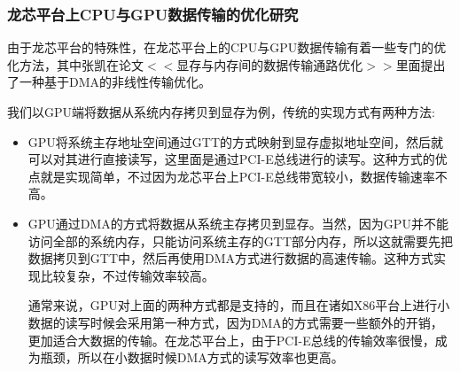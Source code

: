 \subsubsection{龙芯平台上CPU与GPU数据传输的优化研究}

由于龙芯平台的特殊性，在龙芯平台上的CPU与GPU数据传输有着一些专门的优化方法，其中张凯在论文$<<$显存与内存间的数据传输通路优化$>>$\cite{gpu-cpu-data}里面提出了一种基于DMA的非线性传输优化。

我们以GPU端将数据从系统内存拷贝到显存为例，传统的实现方式有两种方法:

\begin{itemize}
\item{} GPU将系统主存地址空间通过GTT的方式映射到显存虚拟地址空间，然后就可以对其进行直接读写，这里面是通过PCI-E总线进行的读写。这种方式的优点就是实现简单，不过因为龙芯平台上PCI-E总线带宽较小，数据传输速率不高。
\item{} GPU通过DMA的方式将数据从系统主存拷贝到显存。当然，因为GPU并不能访问全部的系统内存，只能访问系统主存的GTT部分内存，所以这就需要先把数据拷贝到GTT中，然后再使用DMA方式进行数据的高速传输。这种方式实现比较复杂，不过传输效率较高。

通常来说，GPU对上面的两种方式都是支持的，而且在诸如X86平台上进行小数据的读写时候会采用第一种方式，因为DMA的方式需要一些额外的开销，更加适合大数据的传输。在龙芯平台上，由于PCI-E总线的传输效率很慢，成为瓶颈，所以在小数据时候DMA方式的读写效率也更高。
\end{itemize}
